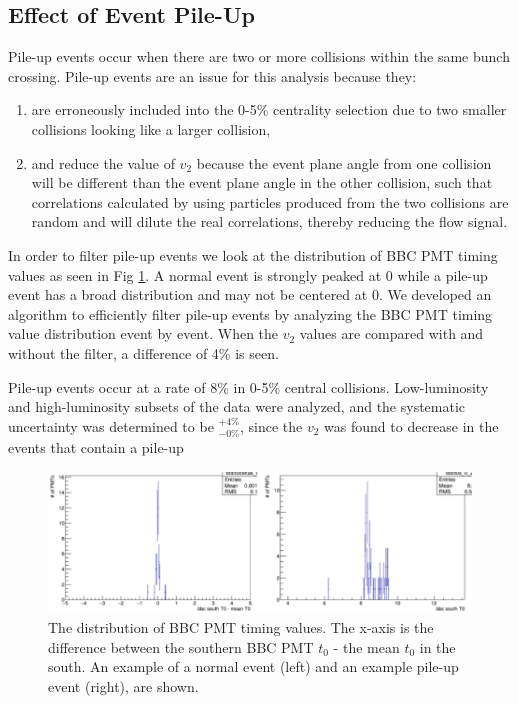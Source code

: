 \subsection{Effect of Event Pile-Up}
Pile-up events occur when there are two or more collisions within the same bunch crossing. Pile-up events are an issue for this analysis because they:
\begin{enumerate}
\item are erroneously included into the 0-5\% centrality selection due to two smaller collisions looking like a larger collision,
\item and reduce the value of $v_2$ because the event plane angle from one collision will be different than the event plane angle in the other collision, such that correlations calculated by using particles produced from the two collisions are random and will dilute the real correlations, thereby reducing the flow signal.
\end{enumerate}

In order to filter pile-up events we look at the distribution of BBC PMT timing values as seen in Fig \ref{fig:pile_up_example}. A normal event is strongly peaked at 0 while a pile-up event has a broad distribution and may not be centered at 0. We developed an algorithm to efficiently filter pile-up events by analyzing the BBC PMT timing value distribution event by event. When the $v_2$ values are compared with and without the filter, a difference of 4\% is seen. 

Pile-up events occur at a rate of 8\% in 0-5\% central \pau collisions. Low-luminosity and high-luminosity subsets of the data were analyzed, and the systematic uncertainty was determined to be $^{+4\%}_{-0\%}$, since the $v_2$  was found to decrease in the events that contain a pile-up

\begin{figure}[!h]
\begin{center}
\includegraphics[width=0.8\linewidth]{figs/example_pile_up_event.png}
\caption{The distribution of BBC PMT timing values. The x-axis is the difference between the southern BBC PMT $t_0$ - the mean $t_0$ in the south. An example of a normal event (left) and an example pile-up event (right), are shown.}
\label{fig:pile_up_example}
\end{center}
\end{figure}

